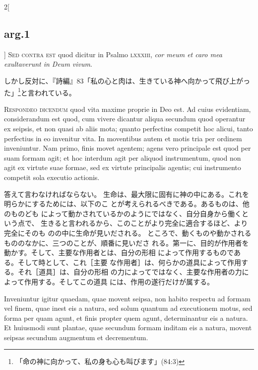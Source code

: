 \documentclass[paper=a4paper,fontsize=10pt,jafontsize=9pt,titlepage]{jlreq}
\begin{document}
\begin{paracol}{2}[\subsection{arg.1}]
{\scshape Sed contra est} quod dicitur in Psalmo {\scshape lxxxiii},
{\itshape cor meum et caro mea exultaverunt in Deum vivum}.

\switchcolumn

しかし反対に、『詩編』83「私の心と肉は、生きている神へ向かって飛び上がっ
 た」\footnote{「命の神に向かって、私の身も心も叫びます」(84:3)}と言われている。



{\scshape Respondeo dicendum} quod vita maxime proprie in Deo est. Ad
cuius evidentiam, considerandum est quod, cum vivere dicantur aliqua
secundum quod operantur ex seipsis, et non quasi ab aliis mota; quanto
perfectius competit hoc alicui, tanto perfectius in eo invenitur
vita. In moventibus autem et motis tria per ordinem inveniuntur. Nam
primo, finis movet agentem; agens vero principale est quod per suam
formam agit; et hoc interdum agit per aliquod instrumentum, quod non
agit ex virtute suae formae, sed ex virtute principalis agentis; cui
instrumento competit sola executio actionis.

\switchcolumn

答えて言わなければならない。
生命は、最大限に固有に神の中にある。これを明らかにするためには、以下のこ
 とが考えられるべきである。あるものは、他のものども
 によって動かされているかのようにではなく、自分自身から働くという点で、
生きると言われるから、このことがより完全に適合するほど、より完全にそのも
 のの中に生命が見いだされる。
ところで、動くものや動かされるもののなかに、三つのことが、順番に見いださ
 れる。第一に、目的が作用者を動かす。そして、主要な作用者とは、自分の形相
 によって作用するものである。そして時として、これ［主要
 な作用者］は、何らかの道具によって作用する。それ［道具］は、自分の形相
 の力によってではなく、主要な作用者の力によって作用する。そしてこの道具
 には、作用の遂行だけが属する。

\switchcolumn*


Inveniuntur igitur quaedam,
quae movent seipsa, non habito respectu ad formam vel finem, quae inest
eis a natura, sed solum quantum ad executionem motus, sed forma per quam
agunt, et finis propter quem agunt, determinantur eis a natura. Et
huiusmodi sunt plantae, quae secundum formam inditam eis a natura,
movent seipsas secundum augmentum et decrementum.

\switchcolumn


\end{paracol}
\end{document}
